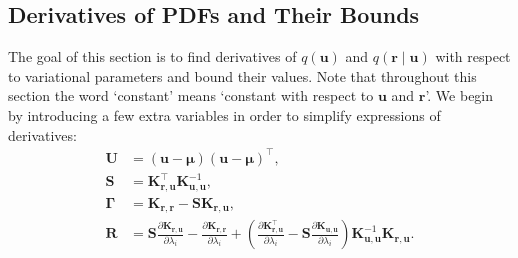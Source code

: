 \documentclass{mpaper}
\newcommand{\Kuu}{\mathbf{K}_{\mathbf{u},\mathbf{u}}}
\newcommand{\Krr}{\mathbf{K}_{\mathbf{r},\mathbf{r}}}
\newcommand{\Kru}{\mathbf{K}_{\mathbf{r},\mathbf{u}}}
\begin{document}
\subsection{Derivatives of PDFs and Their Bounds} \label{sec:derivatives}

The goal of this section is to find derivatives of $q(\mathbf{u})$ and
$q(\mathbf{r} \mid \mathbf{u})$ with respect to variational parameters and
bound their values. Note that throughout this section the word `constant' means
`constant with respect to $\mathbf{u}$ and $\mathbf{r}$'. We begin by
introducing a few extra variables in order to simplify expressions of
derivatives:
\begin{align*}
  \mathbf{U} &= (\mathbf{u} - \bm\mu)(\mathbf{u} - \bm\mu)^\intercal, \\
  \mathbf{S} &= \Kru^\intercal\Kuu^{-1}, \\
  \bm\Gamma &= \Krr - \mathbf{S}\Kru, \\
  \mathbf{R} &= \mathbf{S}\frac{\partial \Kru}{\partial \lambda_i} - \frac{\partial \Krr}{\partial \lambda_i} + \left( \frac{\partial \Kru^\intercal}{\partial \lambda_i} - \mathbf{S}\frac{\partial \Kuu}{\partial \lambda_i} \right) \Kuu^{-1}\Kru.
\end{align*}
\end{document}
